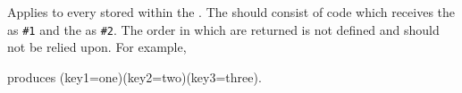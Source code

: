 \documentclass[oneside]{book}
\begin{document}

\begin{function}{\PropVarMapInline}
\begin{syntax}
  
\end{syntax}
Applies  to every  stored
within the . The  should
consist of code which receives the  as \verb|#1| and the
 as \verb|#2|.
The order in which  are returned is not defined and
should not be relied upon.
For example,
\begin{codehigh}
\IgnoreSpacesOn
\PropSetFromKeyval {}
\TlClear \lTmpaTl
\PropVarMapInline {}
\Result {\TlUse\lTmpaTl}
\IgnoreSpacesOff
\end{codehigh}
produces (key1=one)(key2=two)(key3=three).
\end{function}

\end{document}
